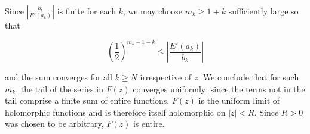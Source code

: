 \begin{solution}
    Since $\left| \frac{b_k}{E'(a_k)} \right|$ is finite for each $k$, we may choose $m_k \ge 1 + k$ sufficiently large 
    so that 

    $$
    \left( \frac{1}{2} \right)^{m_k - 1 - k} \le \left| \frac{E'(a_k)}{b_k} \right|
    $$

    and the sum converges for all $k \ge N$ irrespective of $z$. We conclude that for such $m_k$, the tail of the series 
    in $F(z)$ converges uniformly; since the terms not in the tail comprise a finite sum of entire functions, $F(z)$ is 
    the uniform limit of holomorphic functions and is therefore itself holomorphic on $|z| < R$. Since $R > 0$ was 
    chosen to be arbitrary, $F(z)$ is entire.
    \ \\
\end{solution}